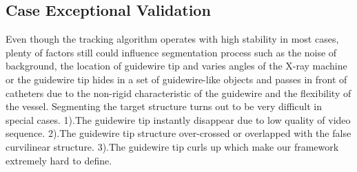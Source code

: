 \documentclass[journal]{IEEEtran}
\begin{document}
\begin{table}[!htb]
	\centering

	\caption{Guidewire Tip Recognition Performance}
\end{table}

\subsection{Case Exceptional Validation}
Even though the tracking algorithm operates with high stability in most cases, plenty of factors still could influence segmentation process such as the noise of background, the location of guidewire tip and varies angles of the X-ray machine or the guidewire tip hides in a set of guidewire-like objects and passes in front of catheters due to the non-rigid characteristic of the guidewire and the flexibility of the vessel. Segmenting the target structure turns out to be very difficult in special cases. 1).The guidewire tip instantly disappear due to low quality of video sequence.
2).The guidewire tip structure over-crossed or overlapped with the false curvilinear structure.
3).The guidewire tip curls up which make our framework extremely hard to define.
\end{document}
